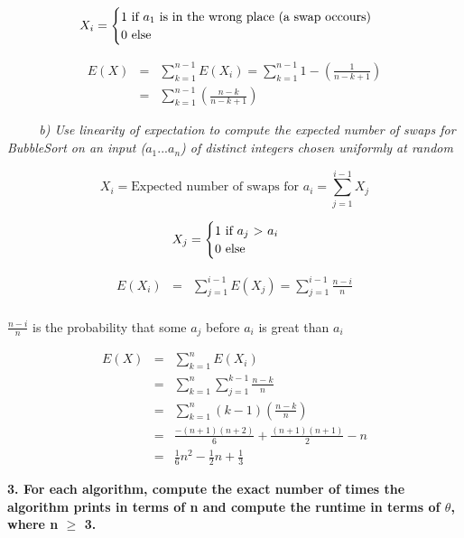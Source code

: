 \documentclass[12pt, letterpaper]{article}
\begin{document}
\[ 
X_i = 
\begin{cases} 
      1 \mbox{\textnormal{ if \(a_1\) is in the wrong place (a swap occours) }} \\
      0 \mbox{\textnormal{ else}} \\
   \end{cases}
\]

\begin{eqnarray}
    E(X) &=& \sum_{k=1}^{n - 1} E(X_i) = \sum_{k=1}^{n - 1} 1 - (\frac{1}{n - k + 1}) \\
    &=& \sum_{k=1}^{n - 1} (\frac{n - k}{n - k + 1})
\end{eqnarray}

\-\ \newline
\-\ \newline
\-\ \it{ b) Use linearity of expectation to compute the expected number of swaps for BubbleSort on an input (\(a_1...a_n\)) of distinct integers chosen uniformly at random }

\[ X_i = \mbox{Expected number of swaps for } a_i = \sum_{j=1}^{i - 1} X_j \]

\[ 
X_j = 
\begin{cases} 
      1 \mbox{\textnormal{ if \(a_j\) \(>\) \(a_i\) }} \\
      0 \mbox{\textnormal{ else}} \\
   \end{cases}
\]

\begin{eqnarray}
    E(X_i) &=& \sum_{j=1}^{i - 1} E(X_j) = \sum_{j=1}^{i - 1} \frac{n - i}{n} \\
\end{eqnarray}

\( \frac{n - i}{n} \) is the probability that some \(a_j\) before \(a_i\) is great than \(a_i\)

\begin{eqnarray}
    E(X) &=& \sum_{k=1}^{n} E(X_i) \\
    &=& \sum_{k=1}^{n} \sum_{j=1}^{k - 1} \frac{n - k}{n} \\
    &=& \sum_{k=1}^{n} (k - 1) (\frac{n - k}{n}) \\
    &=& \frac{-(n+1)(n+2)}{6} + \frac{(n+1)(n+1)}{2} -n \\
    &=& \frac{1}{6}n^{2} - \frac{1}{2} n + \frac{1}{3}
\end{eqnarray}


\newpage
\bf{ 3. For each algorithm, compute the exact number of times the algorithm prints in terms of n and compute the runtime in terms of $\theta$, where n \(\geq\) 3. }
\end{document}

